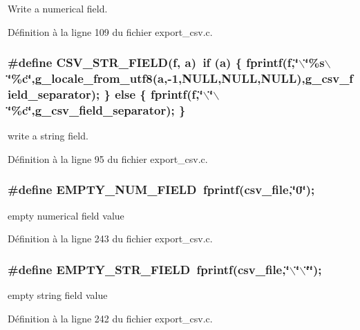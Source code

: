 Write a numerical field. 



Définition à la ligne 109 du fichier export\_\-csv.c.

\subsubsection[{CSV\_\-STR\_\-FIELD}]{\setlength{\rightskip}{0pt plus 5cm}\#define CSV\_\-STR\_\-FIELD(f, \/  a)~if (a) \{ fprintf(f,\char`\"{}$\backslash$\char`\"{}\%s$\backslash$\char`\"{}\%c\char`\"{},g\_\-locale\_\-from\_\-utf8(a,-\/1,NULL,NULL,NULL),g\_\-csv\_\-field\_\-separator); \} else \{ fprintf(f,\char`\"{}$\backslash$\char`\"{}$\backslash$\char`\"{}\%c\char`\"{},g\_\-csv\_\-field\_\-separator); \}}\label{export__csv_8c_af23525285662c417c1e323b088b58663}


write a string field. 



Définition à la ligne 95 du fichier export\_\-csv.c.

\subsubsection[{EMPTY\_\-NUM\_\-FIELD}]{\setlength{\rightskip}{0pt plus 5cm}\#define EMPTY\_\-NUM\_\-FIELD~fprintf(csv\_\-file,\char`\"{}0\char`\"{});}\label{export__csv_8c_ab6159081f8613b916a3ccc10424c497b}
empty numerical field value 

Définition à la ligne 243 du fichier export\_\-csv.c.

\subsubsection[{EMPTY\_\-STR\_\-FIELD}]{\setlength{\rightskip}{0pt plus 5cm}\#define EMPTY\_\-STR\_\-FIELD~fprintf(csv\_\-file,\char`\"{}$\backslash$\char`\"{}$\backslash$\char`\"{}\char`\"{});}\label{export__csv_8c_a56436c049a8245bd45c3a069ca7061ab}
empty string field value 

Définition à la ligne 242 du fichier export\_\-csv.c.



